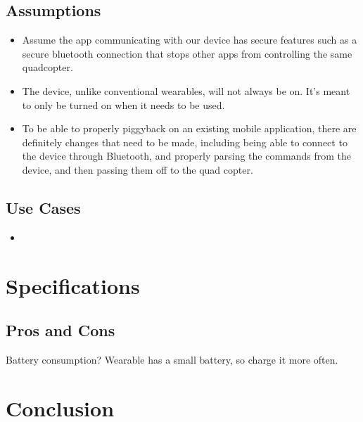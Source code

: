 \documentclass[12pt,letterpaper]{article}
\begin{document}
\subsection*{Assumptions}
\begin{itemize}
\item Assume the app communicating with our device has secure features such as a secure bluetooth connection that stops other apps from controlling the same quadcopter. 
\item The device, unlike conventional wearables, will not always be on. It’s meant to only be turned on when it needs to be used. 
\item To be able to properly piggyback on an existing  mobile application, there are definitely changes that need to be made, including being able to connect to the device through Bluetooth, and properly parsing the commands from the device, and then passing them off to the quad copter.
\end{itemize}

\subsection*{Use Cases}
\begin{itemize}
\item 
\end{itemize}



\section*{Specifications}
\subsection*{Pros and Cons}
Battery consumption?
Wearable has a small battery, so charge it more often.


\section*{Conclusion}

\newpage
\nocite{*}


\end{document}
